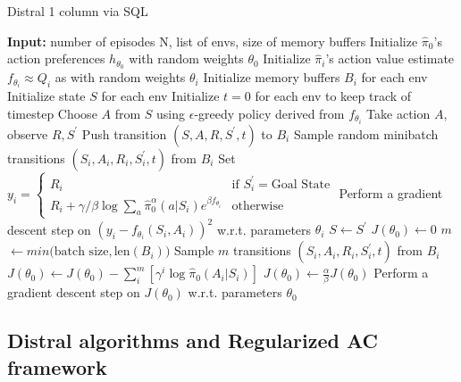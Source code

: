 \documentclass[12pt]{report}
\begin{document}
\begin{algorithm}[H]
\caption{Distral 1 column via SQL}\label{alg:dist1colSQL}
\begin{algorithmic}[1]
\small
\State \textbf{Input: } number of episodes N, list of envs, size of memory buffers
\State Initialize $\hat{\pi}_0$'s action preferences $h_{\theta_0}$ with random weights $\theta_0$
\State Initialize $\hat{\pi}_i$'s action value estimate $f_{\theta_i}\approx Q_i$ as with random weights $\theta_i$
\State Initialize memory buffers $B_i$ for each env
\State Initialize state $S$ for each env
\State Initialize $t = 0$ for each env to keep track of timestep
\State Choose $A$ from $S$ using $\epsilon$-greedy policy derived from $f_{\theta_i}$  \label{pi_logits}
\State Take action $A$, observe $R, S^\prime$
\State Push transition $(S,A,R,S^\prime,t)$ to $B_i$
 
\State Sample random minibatch transitions $(S_i,A_i,R_i,S_i^\prime,t)$ from $B_i$
\State Set $y_i = \begin{cases} R_i &\mbox{if } S_i^\prime = \text{Goal State} \\
R_i + \gamma/\beta \log \sum_a \hat{\pi}_0^\alpha(a|S_i)e^{\beta f_{\theta_i}}  & \mbox{otherwise} \end{cases} $
\State Perform a gradient descent step on $\left(y_i - f_{\theta_i}(S_i,A_i)\right)^2$ w.r.t. parameters $\theta_i$
\EndIf
\State $S \gets S^\prime$
\EndFor
\State $J(\theta_0) \gets 0$
 
\State $m$ $\gets min\big(\text{batch size}, \text{len}(B_i)\big)$
\State Sample $m$ transitions $(S_i,A_i,R_i,S_i^\prime,t)$ from $B_i$
\State $J(\theta_0) \gets J(\theta_0) - \sum_i^m\left[\gamma^i \log{\hat{\pi}_0(A_i | S_i)}\right]$
\EndFor
\State $J(\theta_0) \gets \frac{\alpha}{\beta}J(\theta_0)$ 
\State Perform a gradient descent step on $J(\theta_0)$ w.r.t. parameters $\theta_0$
\EndWhile
\end{algorithmic}
\end{algorithm}

\subsection{Distral algorithms and Regularized AC framework}
\end{document}
